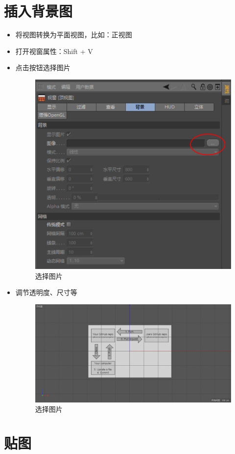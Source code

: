 \documentclass[UTF8,oneside]{ctexbook}
\begin{document}
\section{插入背景图}
\begin{itemize}
    \item 将视图转换为平面视图，比如：正视图
    \item 打开视窗属性：Shift + V
    \item 点击按钮选择图片
    \begin{figure}[H]
        \centering
        \includegraphics[width=0.5\linewidth]{Fig//put_fig.png}
        \vspace{-0.3cm}
        \caption{选择图片}\label{fig:put_fig}
    \end{figure}
    \item 调节透明度、尺寸等
    \begin{figure}[H]
        \centering
        \includegraphics[width=0.5\linewidth]{Fig//put_fig_2.png}
        \vspace{-0.3cm}
        \caption{选择图片}\label{fig:put_fig_2}
    \end{figure}
\end{itemize}
\section{贴图}
\end{document}
